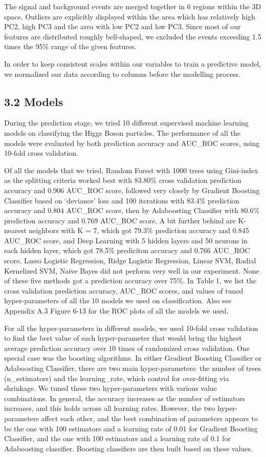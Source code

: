 \documentclass[11pt]{article}
\begin{document}
The signal and background events are merged together in 6 regions within the 3D space. Outliers are explicitly displayed within the area which has relatively high PC2, high PC3 and the area with low PC2 and low PC3. Since most of our features are distributed roughly bell-shaped, we excluded the events exceeding 1.5 times the 95\% range of the given features.

In order to keep consistent scales within our variables to train a predictive model, we normalized our data according to columns before the modelling process.

\subsection*{3.2 Models}

During the prediction stage, we tried 10 different supervised machine learning models on classifying the Higgs Boson particles. The performance of all the models were evaluated by both prediction accuracy and AUC\_ROC scores, using 10-fold cross validation.

Of all the models that we tried, Random Forest with 1000 trees using Gini-index as the splitting criteria worked best with 83.80\% cross validation prediction accuracy and 0.906 AUC\_ROC score, followed very closely by Gradient Boosting Classifier based on `deviance' loss and 100 iterations with 83.4\% prediction accuracy and 0.804 AUC\_ROC score, then by Adaboosting Classifier with 80.6\% prediction accuracy and 0.769 AUC\_ROC score. A bit further behind are K-nearest neighbors with K = 7, which got 79.3\% prediction accuracy and 0.845 AUC\_ROC score, and Deep Learning with 5 hidden layers and 50 neurons in each hidden layer, which got 78.5\% prediciton accuracy and 0.766 AUC\_ROC score. Lasso Logistic Regression, Ridge Logistic Regression, Linear SVM, Radial Kernelized SVM, Naive Bayes did not perform very well in our experiment. None of these five methods got a prediction accuracy over 75\%. In Table 1, we list the cross validation prediction accuracy, AUC\_ROC scores, and values of tuned hyper-parameters of all the 10 models we used on classification. Also see Appendix A.3 Figure 6-13 for the ROC plots of all the models we used.

For all the hyper-parameters in different models, we used 10-fold cross validation to find the best value of each hyper-parameter that would bring the highest average prediction accuracy over 10 times of randomized cross validation. One special case was the boosting algorithms. In either Gradient Boosting Classifier or Adaboosting Classifier, there are two main hyper-parameters: the number of trees (n\_estimators) and the learning\_rate, which control for over-fitting via shrinkage. We tuned these two hyper-parameters with various value combinations. In general, the accuracy increases as the number of estimators increases, and this holds across all learning rates. However, the two hyper-parameters affect each other, and the best combination of parameters appears to be the one with 100 estimators and a learning rate of 0.01 for Gradient Boosting Classifier, and the one with 100 estimators and a learning rate of 0.1 for Adaboosting classifier. Boosting classifiers are then built based on these values.
\end{document}

